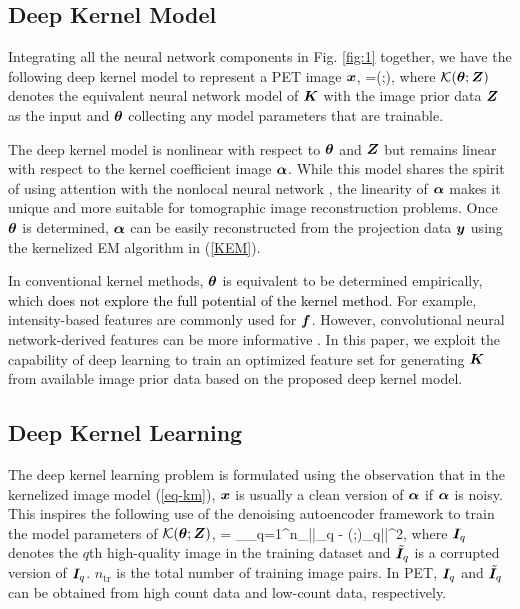 \documentclass[]{IEEETran}
\newcommand{\Kc}{\mathcal{\K}}
\newcommand{\nt}{n_\mathrm{tr}}
\newcommand{\txtb}[1]{\textcolor{black}{#1}}
\begin{document}
	\subsection{Deep Kernel Model}
	
	Integrating all the neural network components in Fig. \ref{fig:1} together, we have the following deep kernel model to represent a PET image $\bm{x}$,
	\beq
	\x=\Kc(\tht;)\alp,
	\eeq
	where $\Kc(\tht;\bmath{Z})$ denotes the equivalent neural network model of $\bm{K}$ with the image prior data $\bm{Z}$ as the input and $\bm{\theta}$ collecting any model parameters that are trainable. 
	
	The deep kernel model is nonlinear with respect to $\bm{\theta}$ and $\bm{Z}$ but remains linear with respect to the kernel coefficient image $\bm{\alpha}$. While this model shares the spirit of using attention with the nonlocal neural network \cite{Wang2018}, the linearity of $\bm{\alpha}$ makes it unique and more suitable for tomographic image reconstruction problems. Once $\bm{\theta}$ is determined, $\bm{\alpha}$ can be easily reconstructed from the projection data $\bm{y}$ using the kernelized EM algorithm in (\ref{KEM}).
	
	In conventional kernel methods, $\bm{\theta}$ is equivalent to be determined empirically, which \txtb{does not explore the full potential of the kernel method}. For example, intensity-based features are commonly used for $\bm{f}$. However, convolutional neural network-derived features can be more informative \cite{Li2021}. In this paper, we exploit the capability of deep learning to train an optimized feature set for generating $\bm{K}$ from available image prior data based on the proposed deep kernel model.
	
	\subsection{Deep Kernel Learning}
	
	The deep kernel learning problem is formulated using the observation that in the kernelized image model  (\ref{eq-km}), $\bm{x}$ is usually a clean version of $\bm{\alpha}$  if $\bm{\alpha}$ is noisy. This inspires the following use of the denoising autoencoder framework \cite{Kramer1991}  to train the model parameters of $\Kc(\tht;\bmath{Z})$,
	\beq
	\hat{\tht} = \arg\min\limits_{\tht}\sum_{q=1}^{\nt}||\I_q - \Kc(\tht;)\tilde{\I}_q||^2,
	\label{supervised}
	\eeq
	where $\bm{I}_q$ denotes the $q$th high-quality image in the training dataset and $\tilde{\bm{I}}_q$ is a corrupted version of $\bm{I}_q$. $\nt$ is the total number of training image pairs. In PET, $\bm{I}_q$  and $\tilde{\bm{I}}_q$ can be obtained from high count data and low-count data, respectively.
	
\end{document}
